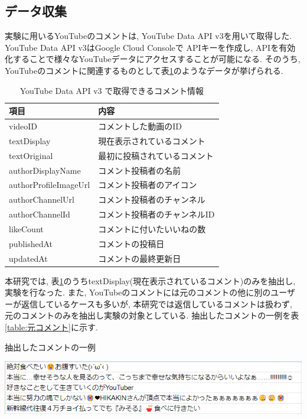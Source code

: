\documentclass{ltjarticle}
\begin{document}
\subsection{データ収集}
実験に用いるYouTubeのコメントは, YouTube Data API v3を用いて取得した. YouTube Data API v3はGoogle Cloud Consoleで
APIキーを作成し, APIを有効化することで様々なYouTubeデータにアクセスすることが可能になる. 
そのうち, YouTubeのコメントに関連するものとして表\ref{table:データ収集}のようなデータが挙げられる. 
\begin{table}[h]
    \caption{YouTube Data API v3 で取得できるコメント情報}
    \vspace{5truept}

    \centering
    \begin{tabular}{ll}
        \hline
        項目 & 内容 \\
        \hline\hline
        videoID & コメントした動画のID\\
        textDisplay & 現在表示されているコメント\\
        textOriginal & 最初に投稿されているコメント\\
        authorDisplayName & コメント投稿者の名前\\
        authorProfileImageUrl & コメント投稿者のアイコン\\
        authorChannelUrl & コメント投稿者のチャンネル\\
        authorChannelId & コメント投稿者のチャンネルID\\
        likeCount & コメントに付いたいいねの数\\
        publishedAt & コメントの投稿日\\
        updatedAt & コメントの最終更新日\\
        \hline
    \end{tabular}
    \label{table:データ収集}
\end{table}

本研究では, 表\ref{table:データ収集}のうちtextDisplay(現在表示されているコメント)のみを抽出し, 実験を行なった. 
また, YouTubeのコメントには元のコメントの他に別のユーザーが返信しているケースも多いが, 本研究では返信しているコメントは扱わず, 
元のコメントのみを抽出し実験の対象としている. 抽出したコメントの一例を表\ref{table:元コメント}に示す. 
\vspace{10truept}

\begin{table}[h]
    \centering
    \caption{抽出したコメントの一例}
    \vspace{5truept}

    \includegraphics[width=14.5cm]{images/元コメント.png}
    \label{table:元コメント}
\end{table}
\newpage
\end{document}
